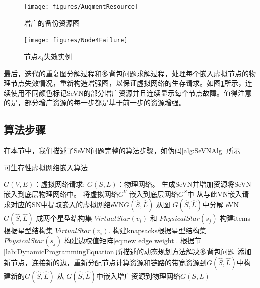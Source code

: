 \begin{figure}[htbp]
\centering
\begin{minipage}{0.4\textwidth}
\centering
\texttt{[image: figures/AugmentResource]}
\caption{增广的备份资源图}\label{fig:AugmentResource}
\end{minipage}
\begin{minipage}{0.4\textwidth}
\centering
\texttt{[image: figures/Node4Failure]}
\caption{节点$s_4$失效实例}\label{fig:Node4Failure}
\end{minipage}\vspace{\baselineskip}
\end{figure}

最后，迭代的重复图分解过程和多背包问题求解过程，处理每个嵌入虚拟节点的物理节点失效情况，重新构造增强图，以保证虚拟网络的生存请求。如图\ref{fig:Node4Failure}所示，连续使用不同颜色标记SeVN的部分增广资源并且连续显示每个节点故障。值得注意的是，部分增广资源的每一步都是基于前一步的资源增强。
\subsection{算法步骤}
在本节中，我们描述了SeVN问题完整的算法步骤，如伪码\ref{alg:SeVNAlg} 所示
\begin{algorithm}
\label{alg:SeVNAlg}
\caption{可生存性虚拟网络嵌入算法}
\begin{algorithmic}[1]
\REQUIRE $G (V,E)$：虚拟网络请求; $G (S,L)$：物理网络。
\ENSURE 生成SeVN并增加资源将SeVN嵌入到底层物理网络中。
\STATE 将虚拟网络$G^V$ 嵌入\cite{liu2011completing}到底层网络$G^S$中
\STATE 从与此VN嵌入请求对应的SN中提取嵌入的虚拟网络eVN$G\left( {\hat S,\hat L} \right)$
\STATE  从图 $G\left( {\hat S,\hat L} \right)$中分解 eVN $G\left( {\hat S,\hat L} \right)$ 成两个星型结构集 $VirtualStar(v_i)$ 和 $PhysicalStar(s_j)$
\STATE 构建items根据星型结构集 $VirtualStar(v_i)$.
\STATE 构建knapsacks根据星型结构集$PhysicalStar(s_j)$
\STATE 构建边权值矩阵\ref{eq:new edge weight}.
\STATE 根据节\ref{lab:DynamicProgrammingEquation}所描述的动态规划方法解决多背包问题
\STATE 添加新节点，连接新的边，重新分配节点计算资源和链路的带宽资源到$G\left( {\hat S,\hat L} \right)$中构建新的$G\left( {\hat S,\hat L} \right)$
\ENDFOR
\STATE 从 $G\left( {\hat S,\hat L} \right)$中嵌入增广资源到物理网络$G(S,L)$
\end{algorithmic}
\end{algorithm}
